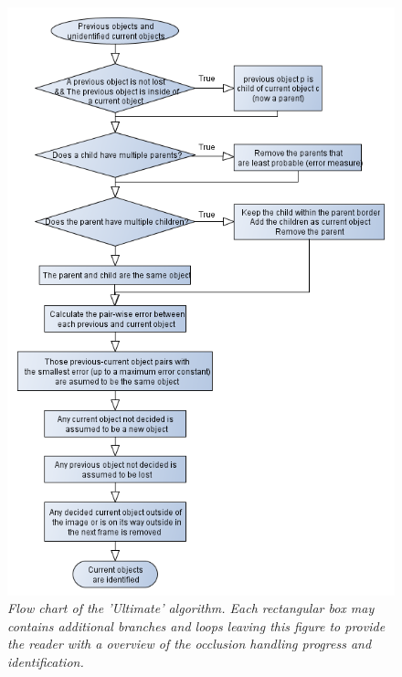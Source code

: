 \newpage
\begin{figure}[h]
	\centering
	\includegraphics[width=123.5mm]{images/data_flow_identification.png}
	\caption{\textit{Flow chart of the 'Ultimate' algorithm. Each rectangular box may contains additional branches and loops leaving this figure to provide the reader with a overview of the occlusion handling progress and identification.}}
	\label{fig:ObjID_fig} %
\end{figure}

